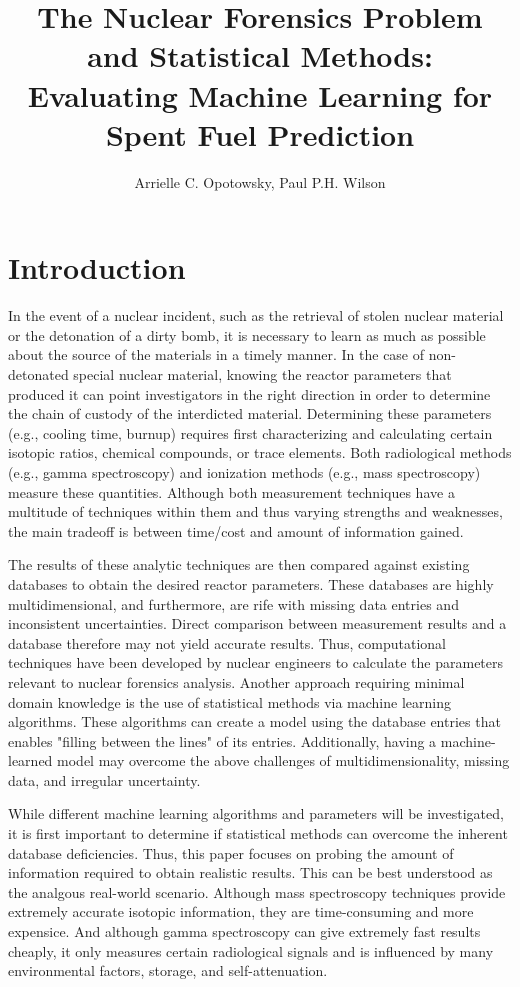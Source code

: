 \documentclass{anstrans}
\title{%
The Nuclear Forensics Problem and Statistical Methods: \\
Evaluating Machine Learning for Spent Fuel Prediction
}
\author{Arrielle C. Opotowsky, Paul P.H. Wilson}
\institute{
Computational Nuclear Engineering Research Group \\
University of Wisconsin at Madison
}
\begin{document}
\section{Introduction}

In the event of a nuclear incident, such as the retrieval of stolen nuclear
material or the detonation of a dirty bomb, it is necessary to learn as much as
possible about the source of the materials in a timely manner. In the case of
non-detonated special nuclear material, knowing the reactor parameters that
produced it can point investigators in the right direction in order to
determine the chain of custody of the interdicted material. Determining these
parameters (e.g., cooling time, burnup) requires first characterizing and
calculating certain isotopic ratios, chemical compounds, or trace elements.
Both radiological methods (e.g., gamma spectroscopy) and ionization methods
(e.g., mass spectroscopy) measure these quantities. Although both measurement
techniques have a multitude of techniques within them and thus varying
strengths and weaknesses, the main tradeoff is between time/cost and amount of
information gained. 

The results of these analytic techniques are then compared against existing
databases to obtain the desired reactor parameters. These databases are highly
multidimensional, and furthermore, are rife with missing data entries and
inconsistent uncertainties. Direct comparison between measurement results and a
database therefore may not yield accurate results. Thus, computational
techniques have been developed by nuclear engineers to calculate the parameters
relevant to nuclear forensics analysis.  Another approach requiring minimal domain knowledge is the use of
statistical methods via machine learning algorithms. These algorithms can
create a model using the database entries that enables "filling between the
lines" of its entries. Additionally, having a machine-learned model may
overcome the above challenges of multidimensionality, missing data, and
irregular uncertainty.

While different machine learning algorithms and parameters will be
investigated, it is first important to determine if statistical methods can
overcome the inherent database deficiencies. Thus, this paper focuses on
probing the amount of information required to obtain realistic results.  This
can be best understood as the analgous real-world scenario. Although mass
spectroscopy techniques provide extremely accurate isotopic information, they
are time-consuming and more expensice. And although gamma spectroscopy can give
extremely fast results cheaply, it only measures certain radiological signals
and is influenced by many environmental factors, storage, and self-attenuation.
\end{document}
